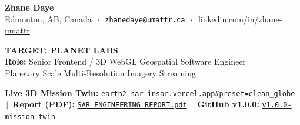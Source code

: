\documentclass[10pt,letterpaper]{article}
\begin{document}
\begin{tcolorbox}[colframe=planetblue,colback=planetblue,coltext=white,boxrule=0pt,top=6pt,bottom=6pt]
\begin{minipage}[c]{0.58\textwidth}
    {\Large\textbf{Zhane Daye}} \\[2pt]
    {\footnotesize Edmonton, AB, Canada $\,\cdot\,$ \texttt{zhanedaye@umattr.ca} $\,\cdot\,$ \href{https://www.linkedin.com/in/zhane-umattr}{linkedin.com/in/zhane-umattr}}
\end{minipage}
\hfill
\begin{minipage}[c]{0.40\textwidth}
    \raggedleft
    {\large\textbf{TARGET: PLANET LABS}}\\[1pt]
    {\footnotesize\textbf{Role:} Senior Frontend / 3D WebGL Geospatial Software Engineer}\\[1pt]
    {\scriptsize Planetary Scale Multi-Resolution Imagery Streaming}
\end{minipage}
\end{tcolorbox}

\vspace{-4pt}

\begin{tcolorbox}[colframe=bordergray,colback=lightbg,top=3pt,bottom=3pt]
\footnotesize
\textbf{Live 3D Mission Twin:} \href{https://earth2-sar-insar.vercel.app#preset=clean_globe&stage=v3}{\texttt{earth2-sar-insar.vercel.app\#preset=clean\_globe}} $\,\vert\,$ 
\textbf{Report (PDF):} \href{https://earth2-sar-insar.vercel.app/reports/EARTH2_X_BAND_SAR_INSAR_ENGINEERING_REPORT.pdf}{\texttt{SAR\_ENGINEERING\_REPORT.pdf}} $\,\vert\,$ 
\textbf{GitHub v1.0.0:} \href{https://github.com/zrt219/earth2studio/releases/tag/v1.0.0-mission-twin}{\texttt{v1.0.0-mission-twin}}
\end{tcolorbox}

\vspace{-4pt}
\end{document}

